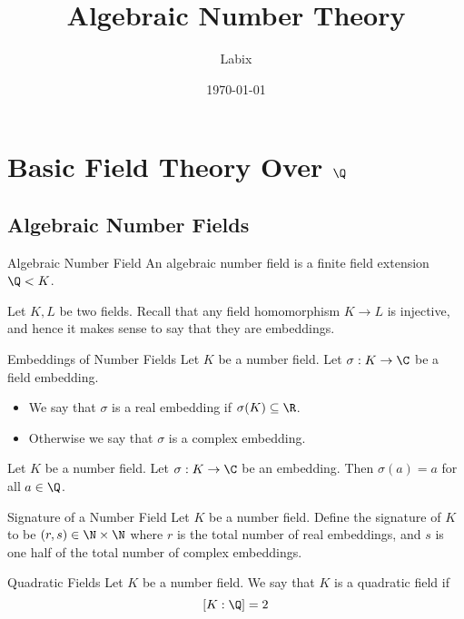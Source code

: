 \documentclass[a4paper]{article}
\title{Algebraic Number Theory}
\author{Labix}
\date{\today}
\begin{document}
\maketitle
\begin{abstract}
\end{abstract}
\tableofcontents
\pagebreak

\section{Basic Field Theory Over $\Q$}
\subsection{Algebraic Number Fields}
\begin{defn}{Algebraic Number Field}{} An algebraic number field is a finite field extension $\Q<K$. 
\end{defn}

Let $K,L$ be two fields. Recall that any field homomorphism $K\to L$ is injective, and hence it makes sense to say that they are embeddings. 

\begin{defn}{Embeddings of Number Fields}{} Let $K$ be a number field. Let $\sigma:K\to\C$ be a field embedding. 
\begin{itemize}
\item We say that $\sigma$ is a real embedding if $\sigma(K)\subseteq\R$. 
\item Otherwise we say that $\sigma$ is a complex embedding. 
\end{itemize}
\end{defn}

\begin{lmm}{}{} Let $K$ be a number field. Let $\sigma:K\to\C$ be an embedding. Then $\sigma(a)=a$ for all $a\in\Q$. 
\end{lmm}

\begin{defn}{Signature of a Number Field}{} Let $K$ be a number field. Define the signature of $K$ to be $(r,s)\in\N\times\N$ where $r$ is the total number of real embeddings, and $s$ is one half of the total number of complex embeddings. 
\end{defn}

\begin{defn}{Quadratic Fields}{} Let $K$ be a number field. We say that $K$ is a quadratic field if $$[K:\Q]=2$$
\end{defn}
\end{document}
